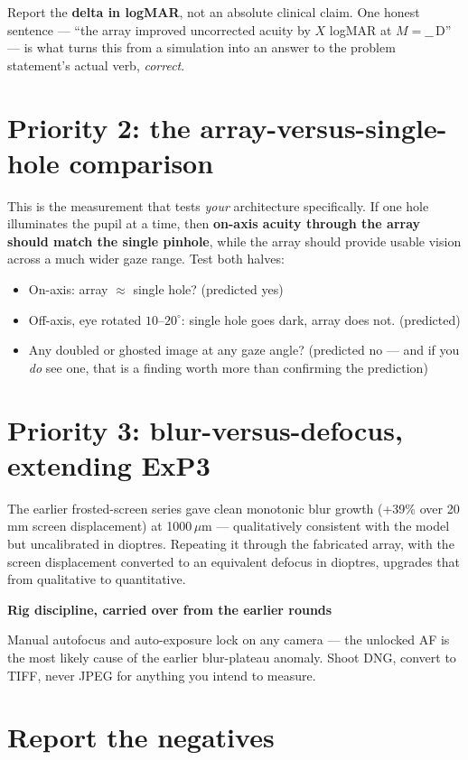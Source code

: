 \documentclass[11pt]{report}
\newenvironment{keybox}[1]%
{\par\vspace{8pt}\begin{lrbox}{\kbsave}\begin{minipage}{0.88\textwidth}%
{\bfseries\color{hbblue}#1}\par\vspace{4pt}\ignorespaces}%
{\end{minipage}\end{lrbox}%
\begin{center}\setlength{\fboxrule}{1.2pt}\setlength{\fboxsep}{8pt}%
\fcolorbox{hbblue}{boxgrey}{\usebox{\kbsave}}\end{center}\vspace{8pt}\par}
\begin{document}
Report the \textbf{delta in logMAR}, not an absolute clinical claim. One honest sentence ---
``the array improved uncorrected acuity by $X$ logMAR at $M = \_\_$\,D'' --- is what turns this
from a simulation into an answer to the problem statement's actual verb, \emph{correct}.

\section{Priority 2: the array-versus-single-hole comparison}

This is the measurement that tests \emph{your} architecture specifically. If one hole illuminates
the pupil at a time, then \textbf{on-axis acuity through the array should match the single
pinhole}, while the array should provide usable vision across a much wider gaze range. Test both
halves:
\begin{itemize}[leftmargin=1.2cm]
\item On-axis: array $\approx$ single hole? (predicted yes)
\item Off-axis, eye rotated $10$--$20^\circ$: single hole goes dark, array does not. (predicted)
\item Any doubled or ghosted image at any gaze angle? (predicted no --- and if you \emph{do} see
one, that is a finding worth more than confirming the prediction)
\end{itemize}

\section{Priority 3: blur-versus-defocus, extending ExP3}

The earlier frosted-screen series gave clean monotonic blur growth (+39\% over 20\,mm screen
displacement) at 1000\,$\mu$m --- qualitatively consistent with the model but uncalibrated in
dioptres. Repeating it through the fabricated array, with the screen displacement converted to an
equivalent defocus in dioptres, upgrades that from qualitative to quantitative.

\begin{keybox}{Rig discipline, carried over from the earlier rounds}
Manual autofocus and auto-exposure lock on any camera --- the unlocked AF is the most likely
cause of the earlier blur-plateau anomaly. Shoot DNG, convert to TIFF, never JPEG for anything
you intend to measure.
\end{keybox}

\section{Report the negatives}
\end{document}
